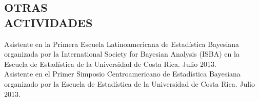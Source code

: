 \documentclass[margin]{res}
\begin{document}
\begin{resume}
\section{OTRAS \\ ACTIVIDADES} 
Asistente en la Primera Escuela Latinoamericana de Estadística Bayesiana organizada por la International Society for Bayesian Analysis (ISBA) en la Escuela de Estadística de la Universidad de Costa Rica. Julio 2013.\\[0.2cm]
Asistente en el Primer Simposio Centroamericano de Estadística Bayesiana organizado por la Escuela de Estadística de la Universidad de Costa Rica. Julio 2013.


\end{resume}
\end{document}
